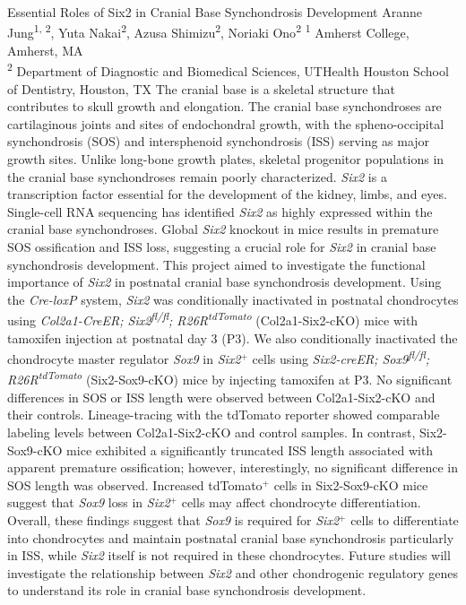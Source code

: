\makeabstract
{ %
Essential Roles of Six2 in Cranial Base Synchondrosis Development
}
{ %
Aranne Jung\textsuperscript{1, 2},
Yuta Nakai\textsuperscript{2},
Azusa Shimizu\textsuperscript{2},
Noriaki Ono\textsuperscript{2}
}
{ %
\textsuperscript{1} Amherst College, Amherst, MA\\
\textsuperscript{2} Department of Diagnostic and Biomedical Sciences, UTHealth Houston School of Dentistry, Houston, TX
}
{ %
The cranial base is a skeletal structure that contributes to skull growth and elongation. The cranial base synchondroses are cartilaginous joints and sites of endochondral growth, with the spheno-occipital synchondrosis (SOS) and intersphenoid synchondrosis (ISS) serving as major growth sites. Unlike long-bone growth plates, skeletal progenitor populations in the cranial base synchondroses remain poorly characterized. \textit{Six2} is a transcription factor essential for the development of the kidney, limbs, and eyes. Single-cell RNA sequencing has identified \textit{Six2} as highly expressed within the cranial base synchondroses. Global \textit{Six2} knockout in mice results in premature SOS ossification and ISS loss, suggesting a crucial role for \textit{Six2} in cranial base synchondrosis development. This project aimed to investigate the functional importance of \textit{Six2} in postnatal cranial base synchondrosis development.
}
{ %
Using the \textit{Cre-loxP} system, \textit{Six2} was conditionally inactivated in postnatal chondrocytes using \textit{Col2a1-CreER; Six2\textsuperscript{fl/fl}; R26R\textsuperscript{tdTomato}} (Col2a1-Six2-cKO) mice with tamoxifen injection at postnatal day 3 (P3). We also conditionally inactivated the chondrocyte master regulator \textit{Sox9} in \textit{Six2}$^+$ cells using \textit{Six2-creER; Sox9\textsuperscript{fl/fl}; R26R\textsuperscript{tdTomato}} (Six2-Sox9-cKO) mice by injecting tamoxifen at P3.
}
{ %
No significant differences in SOS or ISS length were observed between Col2a1-Six2-cKO and their controls. Lineage-tracing with the tdTomato reporter showed comparable labeling levels between Col2a1-Six2-cKO and control samples. In contrast, Six2-Sox9-cKO mice exhibited a significantly truncated ISS length associated with apparent premature ossification; however, interestingly, no significant difference in SOS length was observed. Increased tdTomato$^+$ cells in Six2-Sox9-cKO mice suggest that \textit{Sox9} loss in \textit{Six2}$^+$ cells may affect chondrocyte differentiation.
}
{ %
Overall, these findings suggest that \textit{Sox9} is required for \textit{Six2}$^+$ cells to differentiate into chondrocytes and maintain postnatal cranial base synchondrosis particularly in ISS, while \textit{Six2} itself is not required in these chondrocytes. Future studies will investigate the relationship between \textit{Six2} and other chondrogenic regulatory genes to understand its role in cranial base synchondrosis development.
}
 \newpage